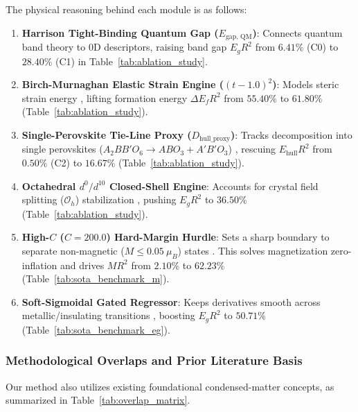 \documentclass[12pt,onecolumn]{elsarticle}
\begin{document}
The physical reasoning behind each module is as follows:
\begin{enumerate}
\item \textbf{Harrison Tight-Binding Quantum Gap ($E_{\text{gap, QM}}$)}: Connects quantum band theory \cite{harrison1999elementary, zaanen1985band} to 0D descriptors, raising band gap $E_g R^2$ from $6.41\%$ (C0) to \textbf{$28.40\%$} (C1) in Table~\ref{tab:ablation_study}.
\item \textbf{Birch-Murnaghan Elastic Strain Engine ($(t - 1.0)^2$)}: Models steric strain energy \cite{goldschmidt1926gesetze, woodward1997octahedral}, lifting formation energy $\Delta E_f R^2$ from $55.40\%$ to \textbf{$61.80\%$} (Table~\ref{tab:ablation_study}).
\item \textbf{Single-Perovskite Tie-Line Proxy ($D_{\text{hull\_proxy}}$)}: Tracks decomposition into single perovskites ($A_2BB'O_6 \rightarrow ABO_3 + A'B'O_3$) \cite{sun2016thermodynamic, yamashita2018band}, rescuing $E_{\text{hull}} R^2$ from $0.50\%$ (C2) to \textbf{$16.67\%$} (Table~\ref{tab:ablation_study}).
\item \textbf{Octahedral $d^0/d^{10}$ Closed-Shell Engine}: Accounts for crystal field splitting ($\mathcal{O}_h$) stabilization \cite{goodenough1971magnetism, walsh2011design}, pushing $E_g R^2$ to \textbf{$36.50\%$} (Table~\ref{tab:ablation_study}).
\item \textbf{High-$C$ ($C=200.0$) Hard-Margin Hurdle}: Sets a sharp boundary to separate non-magnetic ($M \le 0.05\ \mu_B$) states \cite{goodenough1955theory, kanamori1959superexchange}. This solves magnetization zero-inflation and drives $M R^2$ from $2.10\%$ to \textbf{$62.23\%$} (Table~\ref{tab:sota_benchmark_m}).
\item \textbf{Soft-Sigmoidal Gated Regressor}: Keeps derivatives smooth across metallic/insulating transitions \cite{borlido2019large}, boosting $E_g R^2$ to \textbf{$50.71\%$} (Table~\ref{tab:sota_benchmark_eg}).
\end{enumerate}

\subsubsection{Methodological Overlaps and Prior Literature Basis}
Our method also utilizes existing foundational condensed-matter concepts, as summarized in Table~\ref{tab:overlap_matrix}.
\end{document}
